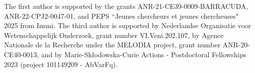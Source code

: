 \documentclass[11pt]{amsart}
\theoremstyle{plain}
\theoremstyle{definition}
\begin{document}
The first author is supported by the grants ANR-21-CE39-0009-BARRACUDA, ANR-22-CPJ2-0047-01, and PEPS “Jeunes chercheurs et jeunes chercheuses" 2025 from Insmi. 
The third author is supported by Nederlandse Organisatie voor Wetenschappelijk Onderzoek, grant number VI.Veni.202.107, by
Agence Nationale de la Recherche under the MELODIA project, grant number ANR-20-CE40-0013, and by
Marie-Sk{\l}odowska-Curie Actions - Postdoctoral Fellowships 2023 (project 101149209 - AbVarFq).
   


\end{document}
